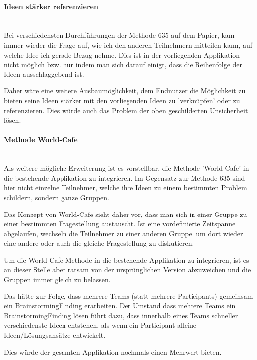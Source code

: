 \paragraph*{Ideen stärker referenzieren}~\\
Bei verschiedensten Durchführungen der Methode 635 auf dem Papier, kam immer wieder die Frage auf, wie ich den anderen Teilnehmern mitteilen kann, auf welche Idee ich gerade Bezug nehme. Dies ist in der vorliegenden Applikation nicht möglich bzw. nur indem man sich darauf einigt, dass die Reihenfolge der Ideen ausschlaggebend ist.

Daher wäre eine weitere Ausbaumöglichkeit, dem Endnutzer die Möglichkeit zu bieten seine Ideen stärker mit den vorliegenden Ideen zu 'verknüpfen' oder zu referenzieren. Dies würde auch das Problem der oben geschilderten Unsicherheit lösen.

\paragraph*{Methode World-Cafe}~\\
Als weitere mögliche Erweiterung ist es vorstellbar, die Methode 'World-Cafe' \cite{world-cafe} in die bestehende Applikation zu integrieren. Im Gegensatz zur Methode 635 sind hier nicht einzelne Teilnehmer, welche ihre Ideen zu einem bestimmten Problem schildern, sondern ganze Gruppen.

Das Konzept von World-Cafe sieht daher vor, dass man sich in einer Gruppe zu einer bestimmten Fragestellung austauscht. Ist eine vordefinierte Zeitspanne abgelaufen, wechseln die Teilnehmer zu einer anderen Gruppe, um dort wieder eine andere oder auch die gleiche Fragestellung zu diskutieren. 

Um die World-Cafe Methode in die bestehende Applikation zu integrieren, ist es an dieser Stelle aber ratsam von der ursprünglichen Version abzuweichen und die Gruppen immer gleich zu belassen. 

Das hätte zur Folge, dass mehrere Teams (statt mehrere Participants) gemeinsam ein BrainstormingFinding erarbeiten. Der Umstand dass mehrere Teams ein BrainstormingFinding lösen führt dazu, dass innerhalb eines Teams schneller verschiedenste Ideen entstehen, als wenn ein Participant alleine Ideen/Lösungsansätze entwickelt. 

Dies würde der gesamten Applikation nochmals einen Mehrwert bieten. 
